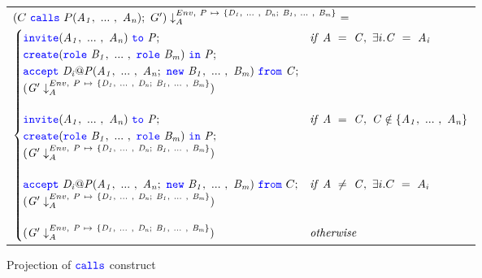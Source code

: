 \documentclass[12pt,twoside]{report}
\begin{document}
\begin{figure}[!h]
    \begin{center}
        \begin{tabular}{l}
            $(C\ \calls\ P(\roles{A}{n});\ G') \projectenv{Env,\ P\ \mapsto\ \{\roles{D}{n};\ \roles{B}{m}\}}\ =$\\[3.5pt]
            \begin{math}
                \begin{cases}
                    \invite(\roles{A}{n})\ \scrto\ \mathit{P}; & \mathit{if}\ \mathit{A}\ =\ \mathit{C},\ \exists i. \mathit{C}\ =\ \mathit{A_i}\\[0.25pt]
                    \create(\rolessig{B}{m})\ \scrin\ \mathit{P}; & \\[0.25pt]
                    \accept\ \mathit{D_i@P}(\roles{A}{n};\ \scrnew\ \roles{B}{m})\ \from\ \mathit{C}; & \\[0.25pt]
                    (\mathit{G'} \projectenv{Env,\ P\ \mapsto\ \{\roles{D}{n};\ \roles{B}{m}\}}) & \\[13pt]

                    \invite(\roles{A}{n})\ \scrto\ \mathit{P}; & \mathit{if}\ \mathit{A}\ =\ \mathit{C},\ \mathit{C} \notin \{\roles{A}{n}\} \\[0.25pt]
                    \create(\rolessig{B}{m})\ \scrin\ \mathit{P}; &\\[0.25pt]
                    (\mathit{G'} \projectenv{Env,\ P\ \mapsto\ \{\roles{D}{n};\ \roles{B}{m}\}}) &\\[13pt]

                    \accept\ \mathit{D_i@P}(\roles{A}{n};\ \scrnew\ \roles{B}{m})\ \from\ C; & \mathit{if}\ \mathit{A}\ \neq\ \mathit{C},\ \exists i. C\ =\ A_i\\[0.25pt]
                    (\mathit{G'} \projectenv{Env,\ P\ \mapsto\ \{\roles{D}{n};\ \roles{B}{m}\}}) & \\[13pt]

                    (\mathit{G'} \projectenv{Env,\ \mathit{P}\ \mapsto\ \{\roles{D}{n};\ \roles{B}{m}\}}) & \mathit{otherwise}
                \end{cases}
            \end{math}
        \end{tabular}
    \end{center}
    \caption{Projection of ${\color{blue}\mathtt{calls}}$ construct}
    \label{scribble-calls-projection}
\end{figure}

\end{document}
